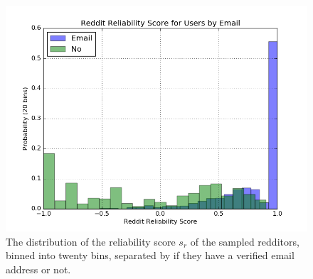 \begin{figure}[tb]
    \centering
    \includegraphics[width=\linewidth]{figures/data_20_email.png}
    \caption{The distribution of the reliability score $s_r$ of the sampled redditors, binned into twenty bins, separated by if they have a verified email address or not.}
    \label{fig:data_20_email}
\end{figure}
